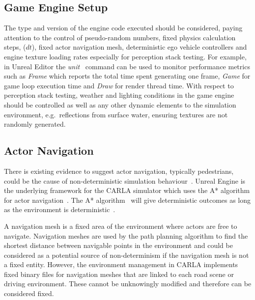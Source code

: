 \documentclass[runningheads,twocolumn,a4paper,10pt]{llncs}
\begin{document}
\subsection{Game Engine Setup}
The type and version of the engine code executed should be considered, paying attention to the control of pseudo-random numbers, fixed physics calculation steps, ($dt$), fixed actor navigation mesh, deterministic ego vehicle controllers and engine texture loading rates especially for perception stack testing. %
%
For example, in Unreal Editor the \textit{unit}~\cite{stat_commands} command can be used to monitor performance metrics such as \textit{Frame} which reports 
the total time spent generating one frame, \textit{Game} for game loop execution time and \textit{Draw} for render thread time. 
%
With respect to perception stack testing, weather and lighting conditions in the game engine should be controlled as well as any other dynamic elements to the simulation environment, e.g.\ reflections from surface water, ensuring textures are not randomly generated. 




\subsection{Actor Navigation}
There is existing evidence to suggest actor navigation, typically pedestrians, could be the cause of non-deterministic simulation behaviour~\cite{CARLABenchmark}.
% 
Unreal Engine is the underlying framework for the CARLA simulator which uses the A* algorithm for actor navigation~\cite{a_Star_oreilly}.
%
The A* algorithm~\cite{AStarBook} will give deterministic outcomes as long as the environment is deterministic~\cite{AirsimUnrealArticle, UnrealAIDocumentation}. 

A navigation mesh is a fixed area of the environment where actors are free to navigate.
%
Navigation meshes are used by the path planning algorithm to find the shortest distance between navigable points in the environment and could be considered as a potential source of non-determinism if the navigation mesh is not a fixed entity. %
%
However, the environment management in CARLA implements fixed binary files for navigation meshes that are linked to each road scene or driving environment. These cannot be unknowingly modified and therefore can be considered fixed. 
\end{document}
